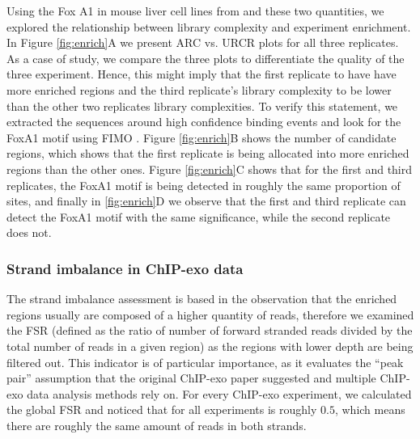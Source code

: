 \documentclass{bmcart}\usepackage[]{graphicx}\usepackage[]{color}
\begin{document}
Using the Fox A1 in mouse liver cell lines from \cite{exoillumina} and
these two quantities, we explored the relationship between library
complexity and experiment enrichment. In Figure \ref{fig:enrich}A we
present ARC vs. URCR plots for all three replicates. As a case of
study, we compare the three plots to differentiate the quality of the
three experiment. Hence, this might imply that the first replicate to
have have more enriched regions and the third replicate's library
complexity to be lower than the other two replicates library
complexities. To verify this statement, we extracted the sequences
around high confidence binding events and look for the FoxA1 motif
using FIMO \cite{fimo}. Figure \ref{fig:enrich}B shows the number of
candidate regions, which shows that the first replicate is being
allocated into more enriched regions than the other ones. Figure
\ref{fig:enrich}C shows that for the first and third replicates, the
FoxA1 motif is being detected in roughly the same proportion of sites,
and finally in \ref{fig:enrich}D we observe that the first and third
replicate can detect the FoxA1 motif with the same significance, while
the second replicate does not.

\subsubsection{Strand imbalance in ChIP-exo data}

The strand imbalance assessment is based in the observation that the
enriched regions usually are composed of a higher quantity of reads,
therefore we examined the FSR (defined as the ratio of number of
forward stranded reads divided by the total number of reads in a given
region) as the regions with lower depth are being filtered out. This
indicator is of particular importance, as it evaluates the ``peak
pair'' assumption that the original ChIP-exo paper suggested and
multiple ChIP-exo data analysis methods rely on. For every ChIP-exo
experiment, we calculated the global FSR and noticed that for all
experiments is roughly $0.5$, which means there are roughly the same
amount of reads in both strands. 
\end{document}
